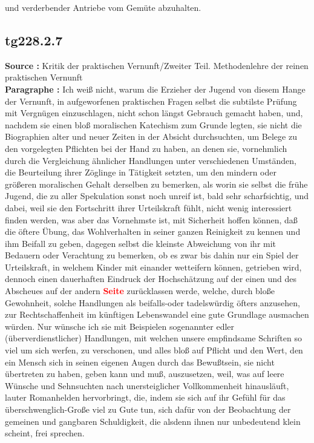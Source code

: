 \documentclass[a4paper,12pt,twoside]{book}
\newcommand{\match}[1]{\textcolor{red}{\textbf{#1}}}
\begin{document}
und verderbender Antriebe vom Gemüte abzuhalten. 
	
	\subsection*{tg228.2.7} 
	\textbf{Source : }Kritik der praktischen Vernunft/Zweiter Teil. Methodenlehre der reinen praktischen Vernunft\\  
	
	\noindent\textbf{Paragraphe : }Ich weiß nicht, warum die Erzieher der Jugend von diesem Hange der Vernunft, in aufgeworfenen praktischen Fragen selbst die subtilste Prüfung mit Vergnügen einzuschlagen, nicht schon längst Gebrauch gemacht haben, und, nachdem sie einen bloß moralischen Katechism zum Grunde legten, sie nicht die Biographien alter und neuer Zeiten in  der Absicht durchsuchten, um Belege zu den vorgelegten Pflichten bei der Hand zu haben, an denen sie, vornehmlich durch die Vergleichung ähnlicher Handlungen unter verschiedenen Umständen, die Beurteilung ihrer Zöglinge in Tätigkeit setzten, um den mindern oder größeren moralischen Gehalt derselben zu bemerken, als worin sie selbst die frühe Jugend, die zu aller Spekulation sonst noch unreif ist, bald sehr scharfsichtig, und dabei, weil sie den Fortschritt ihrer Urteilskraft fühlt, nicht wenig interessiert finden werden, was aber das Vornehmste ist, mit Sicherheit hoffen können, daß die öftere Übung, das Wohlverhalten in seiner ganzen Reinigkeit zu kennen und ihm Beifall zu geben, dagegen selbst die kleinste Abweichung von ihr mit Bedauern oder Verachtung zu bemerken, ob es zwar bis dahin nur ein Spiel der Urteilskraft, in welchem Kinder mit einander wetteifern können, getrieben wird, dennoch einen dauerhaften Eindruck der Hochschätzung auf der einen und des Abscheues auf der andern \match{Seite} zurücklassen werde, welche, durch bloße Gewohnheit, solche Handlungen als beifalls-oder tadelswürdig öfters anzusehen, zur Rechtschaffenheit im künftigen Lebenswandel eine gute Grundlage ausmachen würden. Nur wünsche ich sie mit Beispielen sogenannter edler (überverdienstlicher) Handlungen, mit welchen unsere empfindsame Schriften so viel um sich werfen, zu verschonen, und alles bloß auf Pflicht und den Wert, den ein Mensch sich in seinen eigenen Augen durch das Bewußtsein, sie nicht übertreten zu haben, geben kann und muß, auszusetzen, weil, was auf leere Wünsche und Sehnsuchten nach unersteiglicher Vollkommenheit hinausläuft, lauter Romanhelden hervorbringt, die, indem sie sich auf ihr Gefühl für das überschwenglich-Große viel zu Gute tun, sich dafür von der Beobachtung der gemeinen und gangbaren Schuldigkeit, die alsdenn ihnen nur unbedeutend klein scheint, frei sprechen.
	
\end{document}
